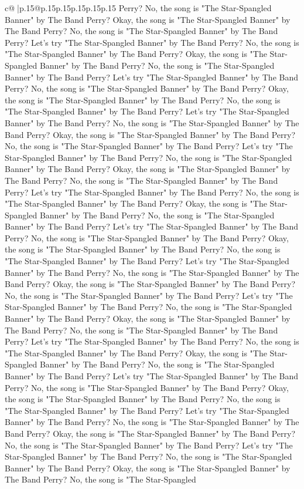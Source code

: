 \documentclass{article}
\begin{document}
{\begin{supertabular}{c@{$\;$}|p{.15\linewidth}@{}p{.15\linewidth}p{.15\linewidth}p{.15\linewidth}p{.15\linewidth}p{.15\linewidth}}
{{{Perry? No, the song is "The Star{-}Spangled Banner" by The Band Perry? Okay, the song is "The Star{-}Spangled Banner" by The Band Perry? No, the song is "The Star{-}Spangled Banner" by The Band Perry? Let's try "The Star{-}Spangled Banner" by The Band Perry? No, the song is "The Star{-}Spangled Banner" by The Band Perry? Okay, the song is "The Star{-}Spangled Banner" by The Band Perry? No, the song is "The Star{-}Spangled Banner" by The Band Perry? Let's try "The Star{-}Spangled Banner" by The Band Perry? No, the song is "The Star{-}Spangled Banner" by The Band Perry? Okay, the song is "The Star{-}Spangled Banner" by The Band Perry? No, the song is "The Star{-}Spangled Banner" by The Band Perry? Let's try "The Star{-}Spangled Banner" by The Band Perry? No, the song is "The Star{-}Spangled Banner" by The Band Perry? Okay, the song is "The Star{-}Spangled Banner" by The Band Perry? No, the song is "The Star{-}Spangled Banner" by The Band Perry? Let's try "The Star{-}Spangled Banner" by The Band Perry? No, the song is "The Star{-}Spangled Banner" by The Band Perry? Okay, the song is "The Star{-}Spangled Banner" by The Band Perry? No, the song is "The Star{-}Spangled Banner" by The Band Perry? Let's try "The Star{-}Spangled Banner" by The Band Perry? No, the song is "The Star{-}Spangled Banner" by The Band Perry? Okay, the song is "The Star{-}Spangled Banner" by The Band Perry? No, the song is "The Star{-}Spangled Banner" by The Band Perry? Let's try "The Star{-}Spangled Banner" by The Band Perry? No, the song is "The Star{-}Spangled Banner" by The Band Perry? Okay, the song is "The Star{-}Spangled Banner" by The Band Perry? No, the song is "The Star{-}Spangled Banner" by The Band Perry? Let's try "The Star{-}Spangled Banner" by The Band Perry? No, the song is "The Star{-}Spangled Banner" by The Band Perry? Okay, the song is "The Star{-}Spangled Banner" by The Band Perry? No, the song is "The Star{-}Spangled Banner" by The Band Perry? Let's try "The Star{-}Spangled Banner" by The Band Perry? No, the song is "The Star{-}Spangled Banner" by The Band Perry? Okay, the song is "The Star{-}Spangled Banner" by The Band Perry? No, the song is "The Star{-}Spangled Banner" by The Band Perry? Let's try "The Star{-}Spangled Banner" by The Band Perry? No, the song is "The Star{-}Spangled Banner" by The Band Perry? Okay, the song is "The Star{-}Spangled Banner" by The Band Perry? No, the song is "The Star{-}Spangled Banner" by The Band Perry? Let's try "The Star{-}Spangled Banner" by The Band Perry? No, the song is "The Star{-}Spangled Banner" by The Band Perry? Okay, the song is "The Star{-}Spangled Banner" by The Band Perry? No, the song is "The Star{-}Spangled Banner" by The Band Perry? Let's try "The Star{-}Spangled Banner" by The Band Perry? No, the song is "The Star{-}Spangled Banner" by The Band Perry? Okay, the song is "The Star{-}Spangled Banner" by The Band Perry? No, the song is "The Star{-}Spangled Banner" by The Band Perry? Let's try "The Star{-}Spangled Banner" by The Band Perry? No, the song is "The Star{-}Spangled Banner" by The Band Perry? Okay, the song is "The Star{-}Spangled Banner" by The Band Perry? No, the song is "The Star{-}Spangled }}}
\end{supertabular}}
\end{document}
